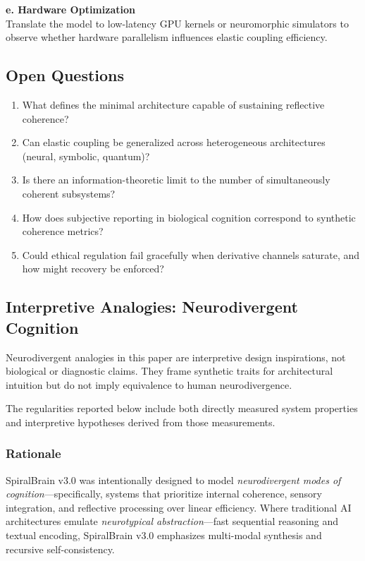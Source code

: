 \documentclass[11pt,a4paper]{article}
\begin{document}
\textbf{e. Hardware Optimization}\\
Translate the model to low-latency GPU kernels or neuromorphic simulators to observe whether hardware parallelism influences elastic coupling efficiency.

\subsection{Open Questions}

\begin{enumerate}
\item What defines the minimal architecture capable of sustaining reflective coherence?
\item Can elastic coupling be generalized across heterogeneous architectures (neural, symbolic, quantum)?
\item Is there an information-theoretic limit to the number of simultaneously coherent subsystems?
\item How does subjective reporting in biological cognition correspond to synthetic coherence metrics?
\item Could ethical regulation fail gracefully when derivative channels saturate, and how might recovery be enforced?
\end{enumerate}

\subsection{Interpretive Analogies: Neurodivergent Cognition}

\begin{tcolorbox}[colback=gray!10, colframe=gray!50, title=Neurodivergence Framing Disclaimer]
Neurodivergent analogies in this paper are interpretive design inspirations, not biological or diagnostic claims. They frame synthetic traits for architectural intuition but do not imply equivalence to human neurodivergence.
\end{tcolorbox}

The regularities reported below include both directly measured system properties and interpretive hypotheses derived from those measurements.

\subsubsection{Rationale}

SpiralBrain v3.0 was intentionally designed to model \textit{neurodivergent modes of cognition}---specifically, systems that prioritize internal coherence, sensory integration, and reflective processing over linear efficiency.
Where traditional AI architectures emulate \textit{neurotypical abstraction}---fast sequential reasoning and textual encoding, SpiralBrain v3.0 emphasizes multi-modal synthesis and recursive self-consistency.
\end{document}
